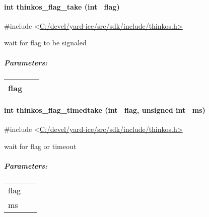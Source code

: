 {\paragraph{\texorpdfstring{{int thinkos\_flag\_take (int
~flag)}}{int thinkos\_flag\_take (int ~flag)}}\label{int-thinkos_flag_take-int-flag}

{}

{\#include
\textless{}}{\protect\hyperlink{h.pkwqa1}{C:/devel/yard-ice/src/sdk/include/thinkos.h}}{\protect\hyperlink{h.pkwqa1}{\textgreater{}}}

{wait for flag to be signaled }

{}

\subparagraph{\texorpdfstring{{Parameters:}}{Parameters:}}\label{parameters-39}

\protect\hypertarget{t.383f7e723be615a1ab251cbb171dc44f8c48c9f4}{}{}\protect\hypertarget{t.39}{}{}

\begin{longtable}[]{@{}ll@{}}
\toprule
\begin{minipage}[t]{0.47\columnwidth}\raggedright\strut
{flag}{~}\strut
\end{minipage} & \begin{minipage}[t]{0.47\columnwidth}\raggedright\strut
{}\strut
\end{minipage}\tabularnewline
\bottomrule
\end{longtable}

\paragraph{\texorpdfstring{{int thinkos\_flag\_timedtake (int ~flag,
unsigned int
~ms)}}{int thinkos\_flag\_timedtake (int ~flag, unsigned int ~ms)}}\label{int-thinkos_flag_timedtake-int-flag-unsigned-int-ms}

{}

{\#include
\textless{}}{\protect\hyperlink{h.pkwqa1}{C:/devel/yard-ice/src/sdk/include/thinkos.h}}{\protect\hyperlink{h.pkwqa1}{\textgreater{}}}

{wait for flag or timeout }

{}

\subparagraph{\texorpdfstring{{Parameters:}}{Parameters:}}\label{parameters-40}

\protect\hypertarget{t.aed66b1bf3dc3447b75e535bc6b7a8c236003a69}{}{}\protect\hypertarget{t.40}{}{}

\begin{longtable}[]{@{}ll@{}}
\toprule
\begin{minipage}[t]{0.47\columnwidth}\raggedright\strut
{flag}{~}\strut
\end{minipage} & \begin{minipage}[t]{0.47\columnwidth}\raggedright\strut
{}\strut
\end{minipage}\tabularnewline
\begin{minipage}[t]{0.47\columnwidth}\raggedright\strut
{ms}{~}\strut
\end{minipage} & \begin{minipage}[t]{0.47\columnwidth}\raggedright\strut
{}\strut
\end{minipage}\tabularnewline
\bottomrule
\end{longtable}

}
